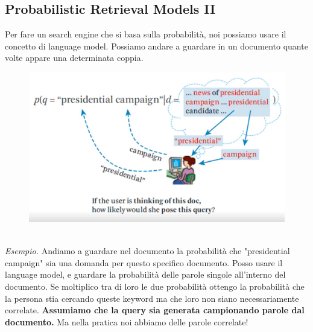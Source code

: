 \subsection{Probabilistic Retrieval Models II}
Per fare un search engine che si basa sulla probabilità, noi possiamo usare il concetto di language model. Possiamo andare a guardare in un documento quante volte appare una determinata coppia. 
\\
\begin{figure}[th]
    \centering
    \includegraphics[scale=0.45]{Text Analysis/img/presidentialcampaign.png}
\end{figure}
\\
\textit{Esempio.} Andiamo a guardare nel documento la probabilità che "presidential campaign" sia una domanda per questo specifico documento. Posso usare il language model, e guardare la probabilità delle parole singole all'interno del documento. Se moltiplico tra di loro le due probabilità ottengo la probabilità che la persona stia cercando queste keyword ma che loro non siano necessariamente correlate. \textbf{Assumiamo che la query sia generata campionando parole dal documento.} Ma nella pratica noi abbiamo delle parole correlate!


